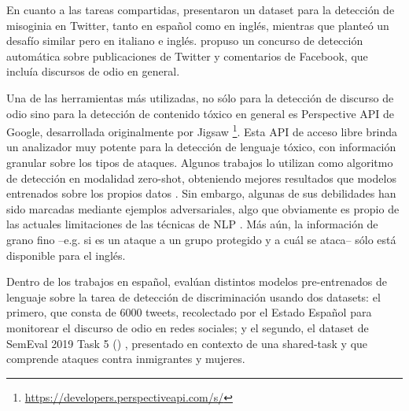 En cuanto a las tareas compartidas, \citet{fersini2018overview} presentaron un dataset para la detección de misoginia en Twitter, tanto en español como en inglés, mientras que \citet{fersini2018evalitaoverview} planteó un desafío similar pero en italiano e inglés. \citet{bosco2018overview} propuso un concurso de detección automática sobre publicaciones de Twitter y comentarios de Facebook, que incluía discursos de odio en general.

Una de las herramientas más utilizadas, no sólo para la detección de discurso de odio sino para la detección de contenido tóxico en general es Perspective API de Google, desarrollada originalmente por Jigsaw \footnote{\url{https://developers.perspectiveapi.com/s/}}. Esta API de acceso libre brinda un analizador muy potente para la detección de lenguaje tóxico, con información granular sobre los tipos de ataques. Algunos trabajos lo utilizan como algoritmo de detección en modalidad zero-shot, obteniendo mejores resultados que modelos entrenados sobre los propios datos \cite{pavlopoulos2020toxicity}. Sin embargo, algunas de sus debilidades han sido marcadas mediante ejemplos adversariales, algo que obviamente es propio de las actuales limitaciones de las técnicas de NLP \cite{hosseini2017deceiving,jain2018adversarial}. Más aún, la información de grano fino --e.g. si es un ataque a un grupo protegido y a cuál se ataca-- sólo está disponible para el inglés.

Dentro de los trabajos en español, \citet{plaza2021pretrained} evalúan distintos modelos pre-entrenados de lenguaje sobre la tarea de detección de discriminación usando dos datasets: el primero, \citet{pereira2019detecting} que consta de 6000 tweets, recolectado por el Estado Español para monitorear el discurso de odio en redes sociales; y el segundo, el dataset de SemEval 2019 Task 5 (\hateval{}) \cite{hateval2019semeval}, presentado en contexto de una shared-task y que comprende ataques contra inmigrantes y mujeres.


